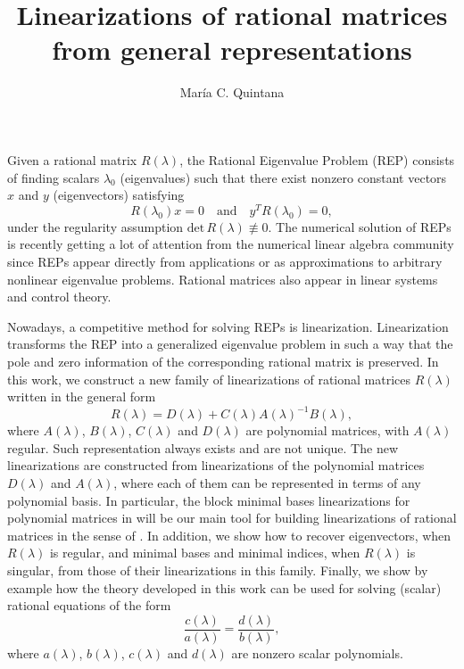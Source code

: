 \documentclass[a4paper]{amsart}
\date{}
\begin{document}
	
	\title{Linearizations of rational matrices from general representations}
	\author{María C. Quintana} %
	\address{Aalto University, Finland.} %
	
	
	\maketitle
	
	
	Given a rational matrix $R(\lambda)$, the Rational Eigenvalue Problem (REP) consists of finding scalars $\lambda_0$ (eigenvalues) such that there exist nonzero constant vectors $x$ and $y$ (eigenvectors) satisfying 
	\[
	R(\lambda_0)x=0 \quad\mbox{and}\quad y^{T}R(\lambda_0)=0,
	\]
	under the regularity assumption $\text{det}\,R(\lambda)\not\equiv 0$. The numerical solution of REPs is recently getting a lot of attention from the numerical linear algebra community since REPs appear directly from applications or as approximations to arbitrary nonlinear eigenvalue problems. Rational matrices also appear in linear systems and control theory.
	
	Nowadays, a competitive method for solving REPs is linearization. Linearization transforms the REP into a generalized eigenvalue problem in such a way that the pole and zero information of the corresponding rational matrix is preserved. In this work, we construct a new family of linearizations of rational matrices $R(\lambda)$  written in the general form  $$R(\lambda)= D(\lambda)+C(\lambda)A(\lambda)^{-1}B(\lambda),$$ where $A(\lambda)$, $B(\lambda)$, $C(\lambda)$ and $D(\lambda)$ are polynomial matrices, with $A(\lambda)$ regular.
	Such representation always exists and are not unique. The new linearizations are constructed from linearizations of the polynomial matrices $D(\lambda)$ and $A(\lambda)$, where each of them can be represented in terms of any polynomial basis. In particular, the block minimal bases linearizations for polynomial matrices in \cite{BKL} will be our main tool for building linearizations of rational matrices in the sense of \cite{local}. In addition, we show how to recover eigenvectors, when $R(\lambda)$ is regular, and  minimal bases and minimal indices, when $R(\lambda)$ is singular, from those of their linearizations in this family. Finally, we show by example how the theory developed in this work can be used for solving (scalar) rational equations of the form
	$$
	\dfrac{c(\lambda)}{a(\lambda)}=\dfrac{d(\lambda)}{b(\lambda)},
	$$
	where $a(\lambda)$, $b(\lambda)$, $c(\lambda)$ and $d(\lambda)$ are nonzero scalar polynomials.
	
\end{document}
